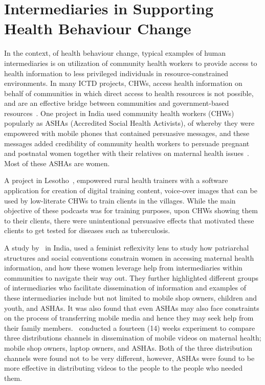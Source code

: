 \section{Intermediaries in Supporting Health Behaviour Change}
In the context, of health behaviour change, typical examples of human intermediaries is on utilization of community health workers to provide access to health information to less privileged individuals in resource-constrained environments.  In many ICTD projects, CHWs, access health information on behalf of communities in which direct access to health resources is not possible, and are an effective bridge between communities and government-based resources~\citep{katule2016leveraging}. One project in India used community health workers (CHWs) popularly as  ASHAs (Accredited Social Health Activists), of whereby they were empowered with mobile phones that contained persuasive messages, and these messages added credibility of community health workers to persuade pregnant and postnatal women together with their relatives on maternal health issues~\citep{ramachandran2010mobile,ramachandran2010research}. Most of these ASHAs are women.

A project in Lesotho~\citep{molapo2013software}, empowered rural health trainers with a software application for creation of digital  training  content, voice-over images  that can be used by low-literate CHWs to train clients in the villages. While the main objective of these podcasts was for training purposes, upon CHWs showing them to their clients, there were unintentional persuasive effects that motivated these clients to get tested for diseases such as tuberculosis.

A study by~\cite{kumar2015mobile} in India, used a feminist reflexivity lens to study how patriarchal structures and social conventions constrain women in accessing maternal health information, and how these women leverage help from intermediaries within communities to navigate their way out. They further highlighted different groups of intermediaries who facilitate dissemination of information and examples of these intermediaries include but not limited to mobile shop owners, children and youth, and ASHAs.  It was also found that even ASHAs may also face constraints on the process of transferring mobile media and hence they may seek help from their family members.~\cite{vashistha2016mobile} conducted a fourteen (14) weeks experiment to compare three distributions channels in dissemination of mobile videos on maternal health; mobile shop owners, laptop owners, and ASHAs. Both of the three distribution channels were found not to be very different, however, ASHAs were found to be more effective in distributing videos to the people to the people who needed them.

